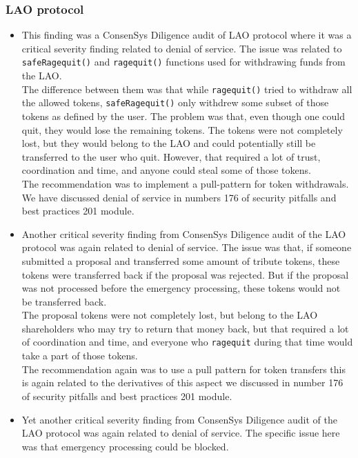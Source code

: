 \subsubsection{LAO protocol}\label{lao-protocol}

\begin{itemize}
\item
  This finding was a ConsenSys Diligence audit of LAO protocol where it
  was a critical severity finding related to denial of service. The
  issue was related to \texttt{safeRagequit()} and \texttt{ragequit()}
  functions used for withdrawing funds from the LAO.\\

  The difference between them was that while \texttt{ragequit()} tried
  to withdraw all the allowed tokens, \texttt{safeRagequit()} only
  withdrew some subset of those tokens as defined by the user. The
  problem was that, even though one could quit, they would lose the
  remaining tokens. The tokens were not completely lost, but they would
  belong to the LAO and could potentially still be transferred to the
  user who quit. However, that required a lot of trust, coordination and
  time, and anyone could steal some of those tokens.\\

  The recommendation was to implement a pull-pattern for token
  withdrawals. We have discussed denial of service in numbers 176 of
  security pitfalls and best practices 201 module.
\item
  Another critical severity finding from ConsenSys Diligence audit of
  the LAO protocol was again related to denial of service. The issue was
  that, if someone submitted a proposal and transferred some amount of
  tribute tokens, these tokens were transferred back if the proposal was
  rejected. But if the proposal was not processed before the emergency
  processing, these tokens would not be transferred back.\\

  The proposal tokens were not completely lost, but belong to the LAO
  shareholders who may try to return that money back, but that required
  a lot of coordination and time, and everyone who \texttt{ragequit}
  during that time would take a part of those tokens.\\

  The recommendation again was to use a pull pattern for token transfers
  this is again related to the derivatives of this aspect we discussed
  in number 176 of security pitfalls and best practices 201 module.
\item
  Yet another critical severity finding from ConsenSys Diligence audit
  of the LAO protocol was again related to denial of service. The
  specific issue here was that emergency processing could be blocked.\\


\end{itemize}
